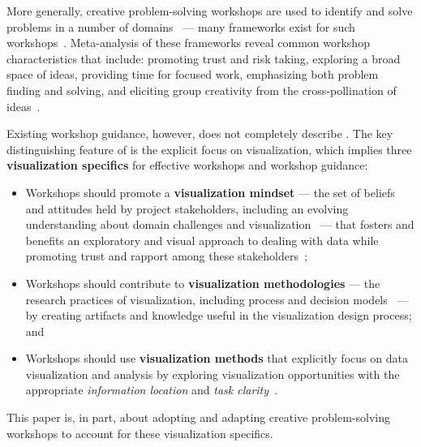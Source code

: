 More generally, creative problem-solving workshops are used to identify and solve problems in a number of domains~\cite{Osborn1953} --- many frameworks exist for such workshops~\cite{CreativeEducationFoundation2015,DeBono1983,Gordon1961,Gray2010,Kumar2012}. Meta-analysis of these frameworks reveal common workshop characteristics that include: promoting trust and risk taking, exploring a broad space of ideas, providing time for focused work, emphasizing both problem finding and solving, and eliciting group creativity from the cross-pollination of ideas~\cite{Nickerson1999}. 


Existing workshop guidance, however, does not completely describe \workshops. The key distinguishing feature of \workshops is the explicit focus on visualization, which implies three {\bf visualization specifics} for effective workshops and workshop guidance:
\begin{itemize}[nolistsep,noitemsep]
    \item Workshops should promote a {\bf visualization mindset} --- the set of beliefs and attitudes held by project stakeholders, including an evolving understanding about domain challenges and visualization~\cite{McCurdy2016a,Sedlmair2012} --- that fosters and benefits an exploratory and visual approach to dealing with data while promoting trust and rapport among these stakeholders~\cite{Shneiderman2006};
    \item Workshops should contribute to {\bf visualization methodologies} --- the research practices of visualization, including process and decision models~\cite{McKenna2014,Munzner2009} --- by creating artifacts and knowledge useful in the visualization design process; and
    \item Workshops should use {\bf visualization methods} that explicitly focus on data visualization and analysis by exploring visualization opportunities with the appropriate {\it information location} and {\it task clarity}~\cite{Sedlmair2012}.
\end{itemize}
This paper is, in part, about adopting and adapting creative problem-solving workshops to account for these visualization specifics.


